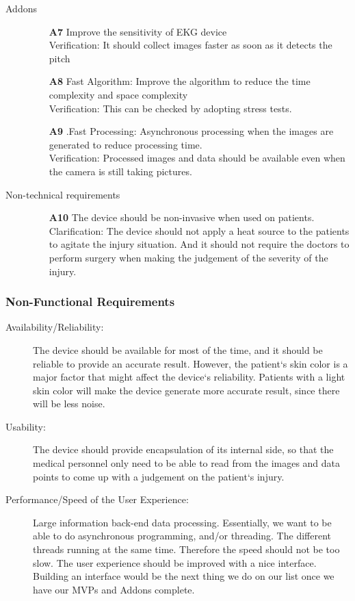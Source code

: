 \documentclass[paper=letter, fontsize=11pt]{scrartcl}
\numberwithin{equation}{section}		%
\numberwithin{figure}{section}			%
\numberwithin{table}{section}			%
\begin{document}
\begin{description}
  \item[Addons] \hspace{1cm}
  	\begin{itemize}
   	\item[\textbf{A7}] Improve the sensitivity of EKG device\\
	\hfill Verification: It should collect images faster as soon as it detects the pitch \\
	\item[\textbf{A8}] Fast Algorithm: Improve the algorithm to reduce the time complexity and space complexity \\
	\hfill Verification: This can be checked by adopting stress tests.
	\item[\textbf{A9}] .Fast Processing: Asynchronous processing when the images are generated to reduce processing time.\\
   	\hfill Verification: Processed images and data should be available even when the camera is still taking pictures.
	\end{itemize}
	
  \item[Non-technical requirements]\hspace{1cm}
  	\begin{itemize}
	\item[\textbf{A10}] The device should be non-invasive when used on patients.
	\hfill Clarification: The device should not apply a heat source to the patients to agitate the injury situation. And it should not require the doctors to perform surgery when making the judgement of the severity of the injury.
	\end{itemize}
\end{description}

\subsubsection{Non-Functional Requirements}
 \begin{description}
  	\item[Availability/Reliability:]
	The device should be available for most of the time, and it should be reliable to provide an accurate result. However, the patient`s skin color is a major factor that might affect the device`s reliability. Patients with a light skin color will make the device generate more accurate result, since there will be less noise.
	\item[Usability:]
	The device should provide encapsulation of its internal side, so that the medical personnel only need to be able to read from the images and data points to come up with a judgement on the patient`s injury.
	\item[Performance/Speed of the User Experience:]
	Large information back-end data processing. Essentially, we want to be able to do asynchronous programming, and/or threading. The different threads running at the same time. Therefore the speed should not be too slow. The user experience should be improved with a nice interface. Building an interface would be the next thing we do on our list once we have our MVPs and Addons complete.
\end{description}
\end{document}
